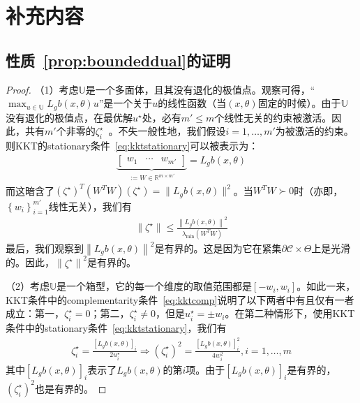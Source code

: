 
\chapter{补充内容}

\section{性质~\ref{prop:boundeddual}的证明}
\label{app:proof:prop:boundeddual}

\begin{proof}
  （1）考虑$\mathbb{U}$是一个多面体，且其没有退化的极值点。观察可得，“$\max_{u \in \mathbb{U}} L_gb(x, \theta) u$”是一个关于$u$的线性函数（当$(x, \theta)$固定的时候）。由于$\mathbb{U}$没有退化的极值点，在最优解$u^\star$处，必有$m' \le m$个线性无关的约束被激活。因此，共有$m'$个非零的$\zeta_i^\star$~\cite{bertsimas97book-lp}。不失一般性地，我们假设$i = 1, \dots, m'$为被激活的约束。则KKT的stationary条件~\eqref{eq:kktstationary}可以被表示为：
  \begin{eqnarray}
    \underbrace{
      \left[ \begin{matrix}
        w_1 & \cdots & w_{m'}
      \end{matrix} \right]
    }_{:= W \in \mathbb{R}^{m \times m'}} = L_gb(x, \theta)
  \end{eqnarray}
  而这暗含了$(\zeta^\star)^T (W^TW) (\zeta^\star) = \parallel L_gb(x, \theta) \parallel^2$。当$W^TW \succ 0$时（亦即，$\left\{ w_i \right\}_{i=1}^{m'}$线性无关），我们有
  \begin{eqnarray}
    \left\lVert \zeta^\star \right\rVert \le \frac{
      \left\lVert L_gb(x, \theta) \right\rVert^2
    }{
      \lambda_{\min} (W^T W)
    }
  \end{eqnarray}
  最后，我们观察到$\left\lVert L_gb(x, \theta) \right\rVert^2$是有界的。这是因为它在紧集$\partial \mathcal{C} \times \Theta$上是光滑的。因此，$\left\lVert \zeta^\star \right\rVert^2$是有界的。

  （2）考虑$\mathbb{U}$是一个箱型，它的每一个维度的取值范围都是$[-w_i, w_i]$。如此一来，KKT条件中的complementarity条件~\eqref{eq:kktcomp}说明了以下两者中有且仅有一者成立：第一，$\zeta_i^\star = 0$；第二，$\zeta_i^\star \ne 0$，但是$u_i^\star = \pm w_i$。在第二种情形下，使用KKT条件中的stationary条件~\eqref{eq:kktstationary}，我们有
  \begin{eqnarray}
    \zeta_i^\star = \frac{
      [L_gb(x, \theta)]_i
    }{2u_i^\star} \Rightarrow 
    (\zeta_i^\star)^2 = \frac{
      [L_gb(x, \theta)]_i^2
    }{4 w_i^2}, i = 1, \dots, m
  \end{eqnarray}
  其中$[L_gb(x, \theta)]_i$表示了$L_gb(x, \theta)$的第$i$项。由于$[L_gb(x, \theta)]_i$是有界的，$(\zeta_i^\star)^2$也是有界的。


\end{proof}
